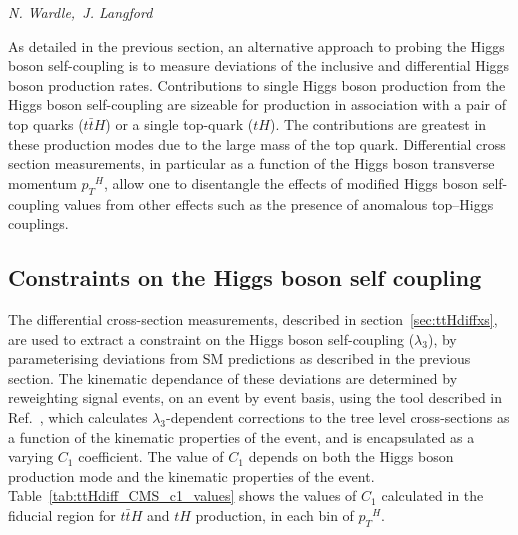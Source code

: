 \newcommand{\ttH}{\ensuremath{t\bar{t}H}}
\newcommand{\pt}{\ensuremath{p_{T}}}
\newcommand{\ptH}{\ensuremath{\pt^{H}}}

\newcommand{\tH}{\ensuremath{tH}}
\newcommand{\tHW}{\ensuremath{tHW}}
\newcommand{\tHQ}{\ensuremath{tHq}}
\newcommand{\VH}{\ensuremath{VH}}
\newcommand{\ggH}{\ensuremath{gg\rightarrow H}}
\newcommand{\mgg}{\ensuremath{m_{\gamma\gamma}}}
\newcommand{\ptgg}{\ensuremath{\pt^{\gamma\gamma}}}

\newcommand{\hgg}{\ensuremath{H\rightarrow\gamma\gamma}}


\begin{center}
\textit{N. Wardle,~J. Langford}
\end{center}


As detailed in the previous section, an alternative approach to probing the Higgs boson self-coupling is to measure deviations of the inclusive and differential Higgs boson production rates. Contributions to single Higgs boson production from the Higgs boson self-coupling are sizeable for production in association with a pair of top quarks ($\ttH$) or a single top-quark ($\tH$). The contributions are  greatest in these production modes due to the large mass of the top quark. Differential cross section measurements, in particular as a function of the Higgs boson 
transverse momentum $\pt^{H}$, allow one to disentangle the effects of modified Higgs boson self-coupling values from 
other effects such as the presence of anomalous top--Higgs couplings.  


\subsection{Constraints on the Higgs boson self coupling}

The differential cross-section measurements, described in section~\ref{sec:ttHdiffxs}, 
are used to extract a 
constraint on the Higgs boson self-coupling ($\lambda_{3}$), by parameterising deviations from SM predictions as described in the previous section. The kinematic dependance of these deviations are determined by reweighting signal events, on an event by event basis,  using the tool described in Ref.~\cite{EWreweightingtool}, which calculates $\lambda_3$-dependent corrections to the tree level cross-sections as a function of the kinematic properties of the event, and is encapsulated as a 
varying $C_{1}$ coefficient. The value of $C_{1}$ depends on both the Higgs boson production mode and the kinematic properties of the event. Table~\ref{tab:ttHdiff_CMS_c1_values} shows the values of $C_1$ calculated in the fiducial region for $\ttH$ and $\tH$ production, in each bin of $\ptH$.

